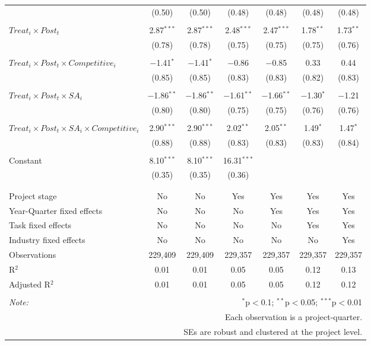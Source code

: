 \documentclass[
]{article}
\begin{document}
\begin{table}[H]
\begin{tabular}{@{\extracolsep{-3pt}}lcccccc}
  & (0.50) & (0.50) & (0.48) & (0.48) & (0.48) & (0.48) \\ 
  & & & & & & \\ 
 $Treat_i \times Post_t$ & 2.87$^{***}$ & 2.87$^{***}$ & 2.48$^{***}$ & 2.47$^{***}$ & 1.78$^{**}$ & 1.73$^{**}$ \\ 
  & (0.78) & (0.78) & (0.75) & (0.75) & (0.75) & (0.76) \\ 
  & & & & & & \\ 
 $Treat_i \times Post_t \times Competitive_i$ & $-$1.41$^{*}$ & $-$1.41$^{*}$ & $-$0.86 & $-$0.85 & 0.33 & 0.44 \\ 
  & (0.85) & (0.85) & (0.83) & (0.83) & (0.82) & (0.83) \\ 
  & & & & & & \\ 
 $Treat_i \times Post_t \times SA_i$ & $-$1.86$^{**}$ & $-$1.86$^{**}$ & $-$1.61$^{**}$ & $-$1.66$^{**}$ & $-$1.30$^{*}$ & $-$1.21 \\ 
  & (0.80) & (0.80) & (0.75) & (0.75) & (0.76) & (0.76) \\ 
  & & & & & & \\ 
 $Treat_i \times Post_t \times SA_i \times Competitive_i$ & 2.90$^{***}$ & 2.90$^{***}$ & 2.02$^{**}$ & 2.05$^{**}$ & 1.49$^{*}$ & 1.47$^{*}$ \\ 
  & (0.88) & (0.88) & (0.83) & (0.83) & (0.83) & (0.84) \\ 
  & & & & & & \\ 
 Constant & 8.10$^{***}$ & 8.10$^{***}$ & 16.31$^{***}$ &  &  &  \\ 
  & (0.35) & (0.35) & (0.36) &  &  &  \\ 
  & & & & & & \\ 
\hline \\[-1.8ex] 
Project stage & No & No & Yes & Yes & Yes & Yes \\ 
Year-Quarter fixed effects & No & No & No & Yes & Yes & Yes \\ 
Task fixed effects & No & No & No & No & Yes & Yes \\ 
Industry fixed effects & No & No & No & No & No & Yes \\ 
Observations & 229,409 & 229,409 & 229,357 & 229,357 & 229,357 & 229,357 \\ 
R$^{2}$ & 0.01 & 0.01 & 0.05 & 0.05 & 0.12 & 0.13 \\ 
Adjusted R$^{2}$ & 0.01 & 0.01 & 0.05 & 0.05 & 0.12 & 0.12 \\ 
\hline 
\hline \\[-1.8ex] 
\textit{Note:}  & \multicolumn{6}{r}{$^{*}$p$<$0.1; $^{**}$p$<$0.05; $^{***}$p$<$0.01} \\ 
 & \multicolumn{6}{r}{Each observation is a project-quarter.} \\ 
 & \multicolumn{6}{r}{SEs are robust and clustered at the project level.} \\ 
\end{tabular} 
\end{table}
\end{document}
